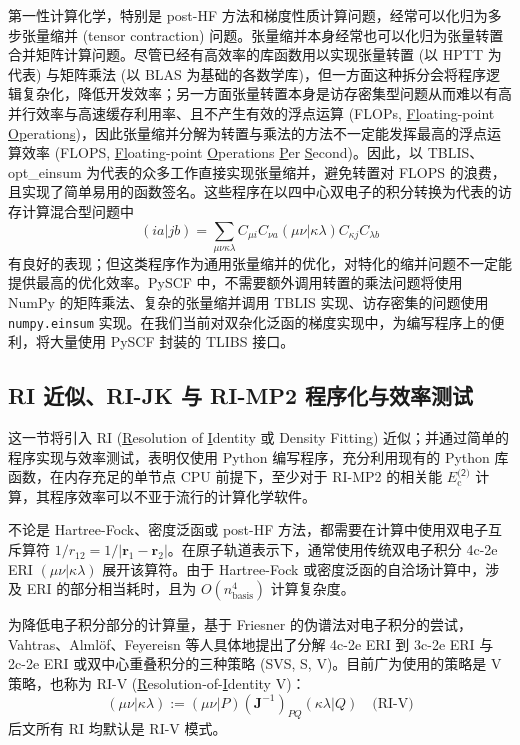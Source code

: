 第一性计算化学，特别是 post-HF 方法和梯度性质计算问题，经常可以化归为多步张量缩并 (tensor contraction) 问题。张量缩并本身经常也可以化归为张量转置合并矩阵计算问题。尽管已经有高效率的库函数用以实现张量转置 (以 HPTT 为代表) 与矩阵乘法 (以 BLAS 为基础的各数学库)，但一方面这种拆分会将程序逻辑复杂化，降低开发效率；另一方面张量转置本身是访存密集型问题从而难以有高并行效率与高速缓存利用率、且不产生有效的浮点运算 (FLOPs, \underline{Fl}oating-point \underline{Op}eration\underline{s})，因此张量缩并分解为转置与乘法的方法不一定能发挥最高的浮点运算效率 (FLOPS, \underline{Fl}oating-point \underline{O}perations \underline{P}er \underline{S}econd)。因此，以 TBLIS、opt\_einsum 为代表的众多工作直接实现张量缩并，避免转置对 FLOPS 的浪费，且实现了简单易用的函数签名。这些程序在以四中心双电子的积分转换为代表的访存计算混合型问题中
\begin{equation*}
  (ia|jb) = \sum_{\mu \nu \kappa \lambda} C_{\mu i} C_{\nu a} (\mu \nu | \kappa \lambda) C_{\kappa j} C_{\lambda b}
\end{equation*}
有良好的表现；但这类程序作为通用张量缩并的优化，对特化的缩并问题不一定能提供最高的优化效率。PySCF 中，不需要额外调用转置的乘法问题将使用 NumPy 的矩阵乘法、复杂的张量缩并调用 TBLIS 实现、访存密集的问题使用 \verb|numpy.einsum| 实现。在我们当前对双杂化泛函的梯度实现中，为编写程序上的便利，将大量使用 PySCF 封装的 TLIBS 接口。

\subsection{RI 近似、RI-JK 与 RI-MP2 程序化与效率测试}
\label{sec.3.rijk-rimp2-efficiency}

这一节将引入 RI (\underline{R}esolution of \underline{I}dentity 或 Density Fitting) 近似；并通过简单的程序实现与效率测试，表明仅使用 Python 编写程序，充分利用现有的 Python 库函数，在内存充足的单节点 CPU 前提下，至少对于 RI-MP2 的相关能 $E_\mathrm{c}^\textsf{(2)}$ 计算，其程序效率可以不亚于流行的计算化学软件。

不论是 Hartree-Fock、密度泛函或 post-HF 方法，都需要在计算中使用双电子互斥算符 $1 / r_{12} = 1 / |\bm{r}_1 - \bm{r}_2|$。在原子轨道表示下，通常使用传统双电子积分 4c-2e ERI $(\mu \nu | \kappa \lambda)$ 展开该算符。由于 Hartree-Fock 或密度泛函的自洽场计算中，涉及 ERI 的部分相当耗时，且为 $O(n_\mathrm{basis}^4)$ 计算复杂度。

为降低电子积分部分的计算量，基于 Friesner 的伪谱法对电子积分的尝试\cite{Friesner-Friesner.CPL.1985, Friesner-Friesner.JCP.1987}，Vahtras、Alml\"of、Feyereisn 等人具体地提出了分解 4c-2e ERI 到 3c-2e ERI 与 2c-2e ERI 或双中心重叠积分的三种策略 (SVS, S, V)\cite{Vahtras-Feyereisen.CPL.1993}。目前广为使用的策略是 V 策略，也称为 RI-V (\underline{R}esolution-of-\underline{I}dentity V)：
\begin{equation}
  (\mu \nu | \kappa \lambda) := (\mu \nu | P) (\mathbf{J}^{-1})_{PQ} (\kappa \lambda | Q) \quad \text{(RI-V)}
\end{equation}
后文所有 RI 均默认是 RI-V 模式。

